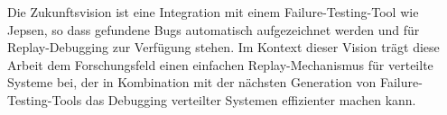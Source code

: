 \documentclass[12pt,a4paper]{report}
\begin{document}
Die Zukunftsvision ist eine Integration mit einem Failure-Testing-Tool wie Jepsen, so dass gefundene Bugs automatisch
aufgezeichnet werden und für Replay-Debugging zur Verfügung stehen. Im Kontext dieser Vision trägt diese Arbeit dem
Forschungsfeld einen einfachen Replay-Mechanismus für verteilte Systeme bei, der in Kombination mit der nächsten Generation von
Failure-Testing-Tools das Debugging verteilter Systemen effizienter machen kann.

% 
% 

\printbibliography
\end{document}
